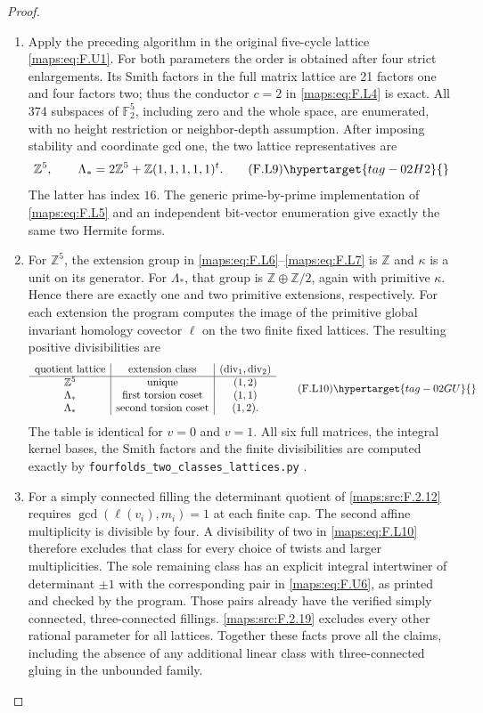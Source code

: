 \begin{proof}
\begin{enumerate}[label={$\langle1\rangle$\arabic*.}]
\item Apply the preceding algorithm in the original five-cycle
lattice \eqref{maps:eq:F.U1}.  For both parameters the order is obtained
after four strict enlargements.  Its Smith factors in the
full matrix lattice are 21 factors one and four factors two;
thus the conductor $c=2$ in \eqref{maps:eq:F.L4} is exact.
All 374 subspaces of $\mathbb F_2^5$, including zero and
the whole space, are enumerated, with no height restriction
or neighbor-depth assumption.
After imposing stability and coordinate gcd one, the two
lattice representatives are
\[
 \mathbb Z^5,\qquad
 \Lambda_* =2\mathbb Z^5+\mathbb Z(1,1,1,1,1)^t.
 \tag{F.L9}\hypertarget{tag-02H2}{}\label{maps:eq:F.L9}
\]
The latter has index $16$.
The generic prime-by-prime implementation of \eqref{maps:eq:F.L5} and
an independent bit-vector enumeration give exactly the
same two Hermite forms.

\item For $\mathbb Z^5$, the extension group in \eqref{maps:eq:F.L6}--\eqref{maps:eq:F.L7}
is $\mathbb Z$ and $\kappa$ is a unit on its generator.
For $\Lambda_*$, that group is
$\mathbb Z\oplus\mathbb Z/2$, again with primitive
$\kappa$.  Hence there are exactly one and two primitive
extensions, respectively.
For each extension the program computes the image of the
primitive global invariant homology covector $\ell$ on
the two finite fixed lattices.  The resulting positive
divisibilities are
\[
\begin{array}{c|c|c}
 \text{quotient lattice}&\text{extension class}&
       (\operatorname{div}_1,\operatorname{div}_2)\\\hline
 \mathbb Z^5&\text{unique}&(1,2)\\
 \Lambda_*&\text{first torsion coset}&(1,1)\\
 \Lambda_*&\text{second torsion coset}&(1,2).
\end{array}
 \tag{F.L10}\hypertarget{tag-02GU}{}\label{maps:eq:F.L10}
\]
The table is identical for $v=0$ and $v=1$.
All six full matrices, the integral kernel bases, the
Smith factors and the finite divisibilities are computed
exactly by \texttt{fourfolds\_two\_classes\_lattices.py}
.

\item For a simply connected filling the determinant quotient
of \ref{maps:src:F.2.12} requires $\gcd(\ell(v_i),m_i)=1$ at each
finite cap.  The second affine multiplicity is divisible
by four.  A divisibility of two in \eqref{maps:eq:F.L10} therefore
excludes that class for every choice of twists and larger
multiplicities.
The sole remaining class has an explicit integral
intertwiner of determinant $\pm1$ with the corresponding
pair in \eqref{maps:eq:F.U6}, as printed and checked by the program.
Those pairs already have the verified simply connected,
three-connected fillings.  \ref{maps:src:F.2.19} excludes every other
rational parameter for all lattices.
Together these facts prove all the claims, including the
absence of any additional linear class with three-connected gluing in the
unbounded family.


\end{enumerate}
\end{proof}
